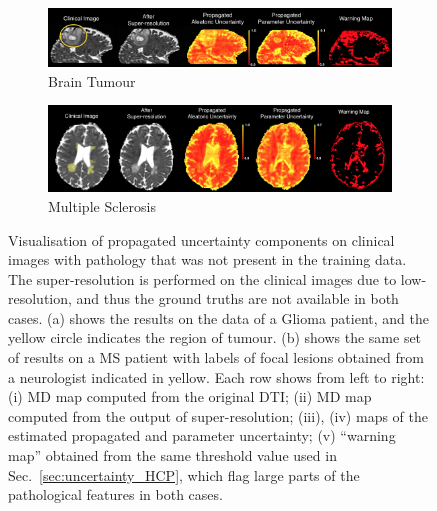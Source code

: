 %
\begin{figure}[ht]
	\centering
	\begin{subfigure}{\textwidth}
		\caption{Brain Tumour}
		\includegraphics[width=\linewidth]{chapter_3/figures/fig_tumour_02.png}
	\end{subfigure}
	\begin{subfigure}{\textwidth}
		\vspace{2mm}
		\caption{Multiple Sclerosis}
		\includegraphics[width=\linewidth]{chapter_3/figures/fig_ms_03.png}
	\end{subfigure}	
	\caption{\footnotesize Visualisation of propagated uncertainty components on clinical images with pathology that was not present in the training data. The super-resolution is performed on the clinical images due to low-resolution, and thus the ground truths are not available in both cases. (a) shows the results on the data of a Glioma patient, and the yellow circle indicates the region of tumour. (b) shows the same set of results on a MS patient with labels of focal lesions obtained from a neurologist indicated in yellow. Each row shows from left to right: (i) MD map computed from the original DTI; (ii) MD map computed from the output of super-resolution; (iii), (iv) maps of the estimated propagated  and parameter uncertainty; (v) ``warning map'' obtained from the same threshold value used in Sec.~\ref{sec:uncertainty_HCP}, which flag large parts of the pathological features in both cases. }
	\label{fig:components_pathology}
\end{figure}

